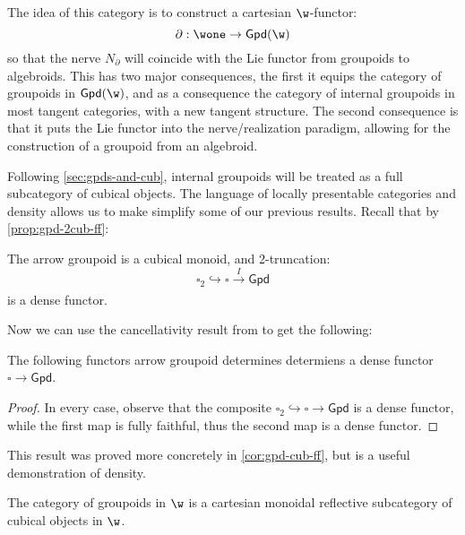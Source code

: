 The idea of this category is to construct a cartesian $\w$-functor:
\[
    \partial: \wone \to \mathsf{Gpd}(\w)    
\]
so that the nerve $N_\partial$ will coincide with the Lie functor from groupoids to algebroids. 
This has two major consequences, the first it equips the category of groupoids in $\mathsf{Gpd}(\w)$, and as a consequence the category of internal groupoids in most tangent categories, with a new tangent structure. The second consequence is that it puts the Lie functor into the nerve/realization paradigm, allowing for the construction of a groupoid from an algebroid.

Following \cref{sec:gpds-and-cub}, internal groupoids will be treated as a full subcategory of cubical objects. The language of locally presentable categories and density allows us to make simplify some of our previous results.
Recall that by \cref{prop:gpd-2cub-ff}: 
\begin{lemma}
    The arrow groupoid is a cubical monoid, and 2-truncation:
    \[
        \square_2 \hookrightarrow \square \xrightarrow[]{I} \mathsf{Gpd}
    \]
    is a dense functor.
\end{lemma}
Now we can use the cancellativity result from  to get the following:
\begin{proposition}%
    \label{prop:I-is-dense}
    The following functors arrow groupoid determines determiens a dense functor $\square \to \mathsf{Gpd}$.
\end{proposition}
\begin{proof}
    In every case, observe that the composite $\square_2 \hookrightarrow \square \to \mathsf{Gpd}$ is a dense functor, while the first map is fully faithful, thus the second map is a dense functor.
\end{proof}
This result was proved more concretely in \cref{cor:gpd-cub-ff}, but is a useful demonstration of density. 
\begin{corollary}
    The category of groupoids in $\w$ is a cartesian monoidal reflective subcategory of cubical objects in $\w$. 
\end{corollary}

